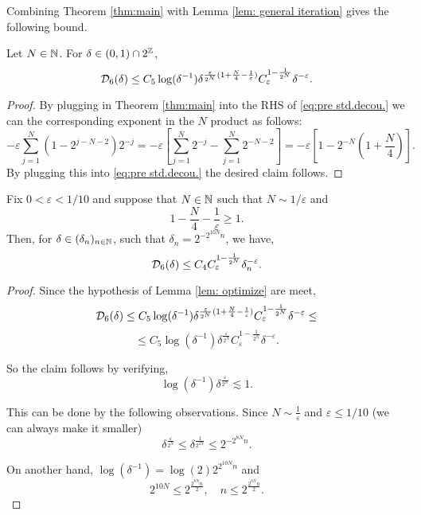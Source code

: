 Combining Theorem \ref{thm:main} with Lemma \ref{lem: general iteration} gives the following bound.
\begin{lem}\label{lem: optimize}
Let $N \in \mathbb{N}$. For $\delta \in (0,1)\cap 2^{\mathbb{Z}}$,
\begin{equation}
    \mathcal{D}_6(\delta)\leq C_5 \log(\delta^{-1})\delta^{\frac{\varepsilon}{2^N}(1 + \frac{N}{4}-\frac{1}{\varepsilon})} C_{\varepsilon}^{1-\frac{1}{2^N}} \delta^{-\varepsilon}. 
\end{equation}
\end{lem}
\begin{proof}
    By plugging in Theorem \ref{thm:main} into the RHS of \ref{eq:pre std.decou.} we can the corresponding exponent in the $N$ product as follows:
    \begin{equation}
        -\varepsilon  \sum_{j=1}^{N}(1-2^{j-N-2})2^{-j} = -\varepsilon \left[\sum_{j=1}^{N}2^{-j} - \sum_{j=1}^{N}2^{-N-2}\right] = -\varepsilon [1- 2^{-N}(1+\frac{N}{4})].
    \end{equation}
    By plugging this into \ref{eq:pre std.decou.} the desired claim follows.
\end{proof}
\begin{lem}\label{lem:dyadic prop}
    Fix $0<\varepsilon<1/10$ and suppose that $N\in \mathbb{N}$ such that $N \sim 1/\varepsilon$ and 
    $$
    1-\frac{N}{4}-\frac{1}{\varepsilon}\geq 1.
    $$
    Then, for $\delta \in (\delta_n)_{n\in\mathbb{N}}$, such that $\delta_n = 2^{-2^{10N}n}$, we have,
    $$
    \mathcal{D}_6(\delta) \leq C_4 C_{\varepsilon}^{1-\frac{1}{2^N}} \delta_{n}^{-\varepsilon}.
    $$
\end{lem}
\begin{proof}
    Since the hypothesis of Lemma \ref{lem: optimize} are meet,
    $$
     \mathcal{D}_6(\delta)\leq C_5 \log(\delta^{-1})\delta^{\frac{\varepsilon}{2^N}(1 + \frac{N}{4}-\frac{1}{\varepsilon})} C_{\varepsilon}^{1-\frac{1}{2^N}} \delta^{-\varepsilon} \leq 
    $$
    $$
    \leq C_5 \log(\delta^{-1})\delta^{\frac{\varepsilon}{2^N}} C_{\varepsilon}^{1-\frac{1}{2^N}} \delta^{-\varepsilon}. 
    $$

    So  the claim follows by verifying,
    $$
    \log(\delta^{-1})\delta^{\frac{\varepsilon}{2^N}} \lesssim 1.
    $$

    This can be done by the following observations. Since $N\sim \frac{1}{\varepsilon}$ and $\varepsilon \leq 1/10$ (we can always make it smaller) 
    $$
    \delta^{\frac{\varepsilon}{2^N}} \leq \delta^{\frac{1}{2^{2N}}}\leq 2^{-2^{8N}n}.
    $$

    On another hand, $\log(\delta^{-1})=\log(2) 2^{2^{10N}n}$ and 
    $$
    2^{10N}\leq 2^{\frac{2^{8N}n}{2}}, \quad n\leq 2^\frac{2^{8N}n}{2}.
    $$
\end{proof}

